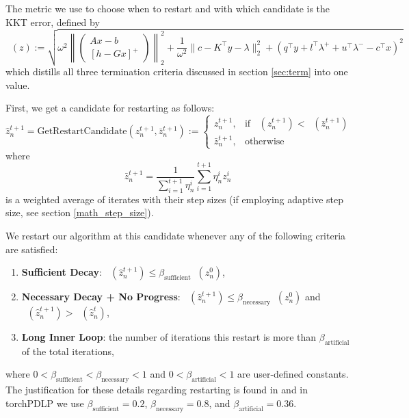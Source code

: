 \documentclass[twoside,12pt,openright]{report}  %
\DeclareMathOperator*{\KKT}{\text{KKT}_\omega}
\begin{document}
The metric we use to choose when to restart and with which candidate is the KKT error, defined by
\begin{equation}\KKT (z):=\sqrt{\omega^2 \left\|\begin{pmatrix} Ax-b \\ [h-Gx]^+ \end{pmatrix}\right\|_2^2 +\frac{1}{\omega^2}\|c-K^\top y -\lambda\|_2^2 + (q^\top y +l^\top \lambda^+ +u^\top \lambda^- -c^\top x)^2}\end{equation}
which distills all three termination criteria discussed in section \ref{sec:term} into one value.

First, we get a candidate for restarting as follows: \[
\hat{z}_n^{t+1} = \text{GetRestartCandidate}(z_n^{t+1}, \bar{z}_n^{t+1}) :=
    \begin{cases}
        z_n^{t+1}, & \text{if } \KKT(z_n^{t+1}) < \KKT(\bar{z}_n^{t+1}) \\
        \bar{z}_n^{t+1}, & \text{otherwise}
    \end{cases}
\]
where \[\bar{z}_n^{t+1} = \frac{1}{\sum_{i=1}^{t+1} \eta_n^i} \sum_{i=1}^{t+1} \eta_n^i z_n^i\] is a weighted average of iterates with their step sizes (if employing adaptive step size, see section \ref{math_step_size}).

We restart our algorithm at this candidate whenever any of the following criteria are satisfied:
\begin{enumerate}
    \item \textbf{Sufficient Decay}: \(\KKT(\hat{z}_n^{t+1}) \leq \beta_{\text{sufficient}} \KKT(z_n^0)\),
    \item \textbf{Necessary Decay + No Progress}: \(\KKT(\hat{z}_n^{t+1}) \leq \beta_{\text{necessary}} \KKT(z_n^0)\) 
          and \(\KKT(\hat{z}_n^{t+1}) > \KKT(\hat{z}_n^t)\),
    \item \textbf{Long Inner Loop}: the number of iterations this restart is more than \(\beta_{\text{artificial}}\) of the total iterations,
\end{enumerate}
where \(0 < \beta_{\text{sufficient}} < \beta_{\text{necessary}} < 1\) and \(0 < \beta_{\text{artificial}} < 1\) are user-defined constants. The justification for these details regarding restarting is found in \cite{Applegate_2022} and in torchPDLP we use $\beta_{\text{sufficient}}=0.2$, $\beta_{\text{necessary}}=0.8$, and $\beta_{\text{artificial}}=0.36$. 
\end{document}
